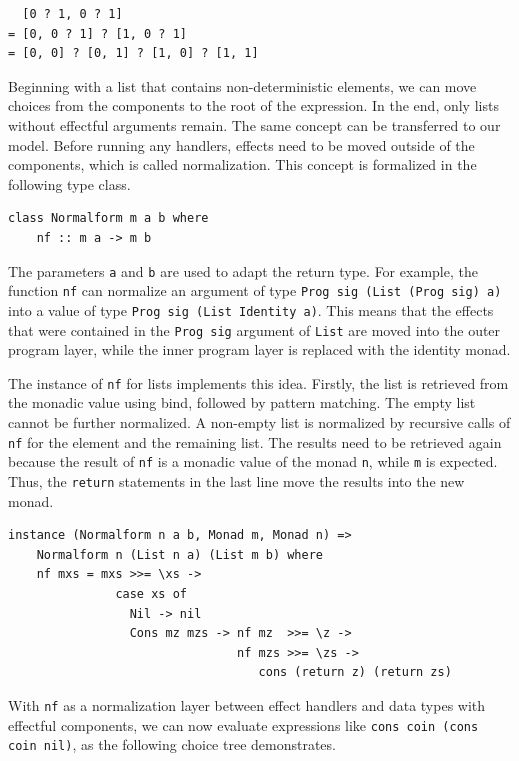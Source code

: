 \documentclass[a4paper, 11pt, fleqn, twoside, abstract=on]{scrreprt}
\newcommand{\hinl}[1]{\texttt{#1}}
\begin{document}
\begin{verbatim}
  [0 ? 1, 0 ? 1]
= [0, 0 ? 1] ? [1, 0 ? 1]
= [0, 0] ? [0, 1] ? [1, 0] ? [1, 1]
\end{verbatim}

Beginning with a list that contains non-deterministic elements, we can move choices from the components to the root of the expression.
In the end, only lists without effectful arguments remain.
The same concept can be transferred to our model.
Before running any handlers, effects need to be moved outside of the components, which is called normalization.
This concept is formalized in the following type class.

\begin{verbatim}
class Normalform m a b where
    nf :: m a -> m b
\end{verbatim}

The parameters \hinl{a} and \hinl{b} are used to adapt the return type.
For example, the function \hinl{nf} can normalize an argument of type \hinl{Prog sig (List (Prog sig) a)} into a value of type \hinl{Prog sig (List Identity a)}.
This means that the effects that were contained in the \hinl{Prog sig} argument of \hinl{List} are moved into the outer program layer, while the inner program layer is replaced with the identity monad.

The instance of \hinl{nf} for lists implements this idea.
Firstly, the list is retrieved from the monadic value using bind, followed by pattern matching.
The empty list cannot be further normalized.
A non-empty list is normalized by recursive calls of \hinl{nf} for the element and the remaining list.
The results need to be retrieved again because the result of \hinl{nf} is a monadic value of the monad \hinl{n}, while \hinl{m} is expected.
Thus, the \hinl{return} statements in the last line move the results into the new monad.
\begin{verbatim}
instance (Normalform n a b, Monad m, Monad n) =>
    Normalform n (List n a) (List m b) where
    nf mxs = mxs >>= \xs ->
               case xs of
                 Nil -> nil
                 Cons mz mzs -> nf mz  >>= \z ->
                                nf mzs >>= \zs ->
                                   cons (return z) (return zs)
\end{verbatim}

With \hinl{nf} as a normalization layer between effect handlers and data types with effectful components, we can now evaluate expressions like \hinl{cons coin (cons coin nil)}, as the following choice tree demonstrates.
\end{document}
